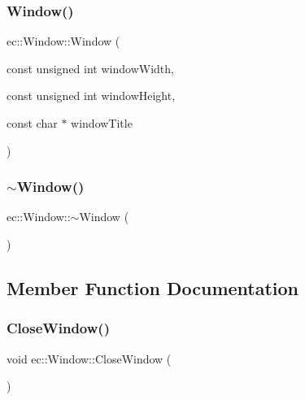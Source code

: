 \subsubsection{\texorpdfstring{Window()}{Window()}}
{\footnotesize\ttfamily ec\+::\+Window\+::\+Window (\begin{DoxyParamCaption}\item[{const unsigned int}]{window\+Width,  }\item[{const unsigned int}]{window\+Height,  }\item[{const char $\ast$}]{window\+Title }\end{DoxyParamCaption})\hspace{0.3cm}{\ttfamily [explicit]}}

\mbox{\label{classec_1_1_window_a639d3f230ca0e232066b4c61a5a212b7}} 
\subsubsection{\texorpdfstring{$\sim$\+Window()}{~Window()}}
{\footnotesize\ttfamily ec\+::\+Window\+::$\sim$\+Window (\begin{DoxyParamCaption}{ }\end{DoxyParamCaption})\hspace{0.3cm}{\ttfamily [virtual]}}



\subsection{Member Function Documentation}
\mbox{\label{classec_1_1_window_a6605c513a7dbab0b43ddfad6ff7ac55a}} 
\subsubsection{\texorpdfstring{Close\+Window()}{CloseWindow()}}
{\footnotesize\ttfamily void ec\+::\+Window\+::\+Close\+Window (\begin{DoxyParamCaption}{ }\end{DoxyParamCaption})}

\mbox{\label{classec_1_1_window_ad8b192b0b757ec15d233d65e52dedc2c}} 
